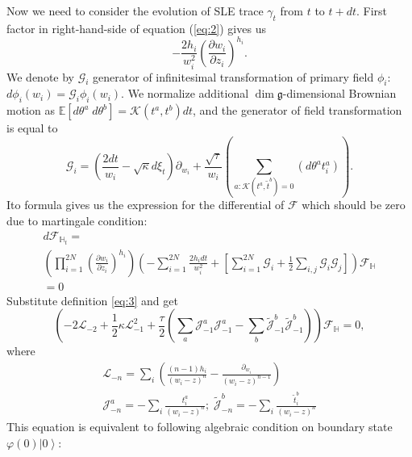 \documentclass{jetpl}
\newcommand{\gf}{\mathfrak{g}}
\begin{document}
Now we need to consider the evolution of SLE trace $\gamma_{t}$ from  $t$ to $t+ dt$. First factor in right-hand-side of equation (\ref{eq:2}) gives us
\begin{equation*}
  -\frac{2h_{i}}{w_{i}^{2}}\left(\frac{\partial w_{i}}{\partial z_{i}}\right)^{h_{i}}.
\end{equation*}
We denote by $\mathcal{G}_{i}$ generator of infinitesimal transformation of primary field $\phi_{i}$:$d\phi_{i}(w_{i}) = \mathcal{G}_{i}\phi_{i}(w_{i})$. We normalize additional $\dim\gf$-dimensional Brownian motion as $\mathbb{E}\left[d\theta^{a}\; d\theta^{b}\right]=\mathcal{K}(t^{a},t^{b})dt$, and the generator of field transformation is equal to 
\begin{equation}
  \mathcal{G}_{i}=\left(\frac{2dt}{w_{i}}-\sqrt{\kappa} d\xi_{t}\right) \partial_{w_{i}}+\frac{\sqrt{\tau}}{w_{i}}\left(\sum_{a:\mathcal{K}(t^{a},\tilde{t}^{b})=0}\left(d \theta ^{a} t^{a}_{i}\right)\right).
\label{eq:3}
\end{equation}
 Ito formula  gives us the expression for the differential of $\mathcal{F}$ which should be zero due to martingale condition:
\begin{multline}
d \mathcal{F}_{\mathbb{H}_{t}}=\\ \left(\prod_{i=1}^{2N}\left(\frac{\partial w_{i}}{\partial z_{i}}\right)^{h_{i}}\right)
\left(-\sum_{i=1}^{2N}\frac{2h_{i}dt}{w_{i}^{2}}+\left[\sum_{i=1}^{2N}\mathcal{G}_{i}+\frac{1}{2}
      \sum_{i,j}\mathcal{G}_{i}\mathcal{G}_{j}\right]\right)\mathcal{F}_{\mathbb{H}}\\=0
\label{eq:8}
\end{multline}
Substitute definition \eqref{eq:3} and get 
\begin{equation}
  \left(-2 \mathcal{L}_{-2}+\frac{1}{2}\kappa \mathcal{L}_{-1}^{2}+\frac{\tau}{2}\left( \sum_{a} \mathcal{J}^{a}_{-1} \mathcal{J}^{a}_{-1}-
      \sum_{b}\tilde{\mathcal{J}}^{b}_{-1} \tilde{\mathcal{J}}^{b}_{-1}\right)\right)        \mathcal{F}_{\mathbb{H}}=0,
  \label{eq:4}
\end{equation}
where
\begin{eqnarray*}
  \mathcal{L}_{-n}=\sum_{i}\left(\frac{(n-1)h_{i}}{(w_{i}-z)^{n}}-\frac{\partial_{w_{i}}}{(w_{i}-z)^{n-1}}\right)\\ \mathcal{J}^{a}_{{-n}}=-\sum_{i}\frac{t^{a}_{i}}{(w_{i}-z)^{n}};\; \tilde{\mathcal{J}}^{b}_{{-n}}=-\sum_{i}\frac{\tilde{t}^{b}_{i}}{(w_{i}-z)^{n}}
\end{eqnarray*}
This equation is equivalent to following algebraic condition on boundary state $\varphi(0)\left|0\right>$:
\end{document}
